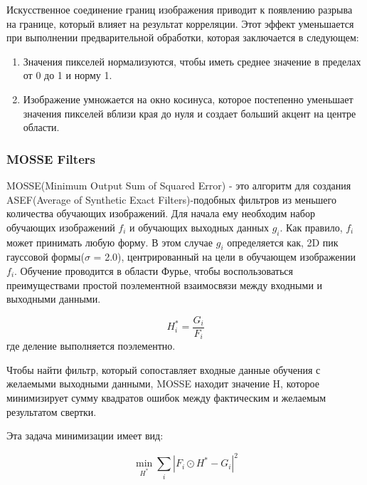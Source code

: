 \documentclass[a4paper,14pt]{extarticle}
\begin{document}
Искусственное соединение границ изображения приводит к появлению разрыва на границе, который влияет на результат корреляции. Этот эффект уменьшается при выполнении предварительной обработки, которая заключается в следующем: 

\begin{enumerate}
    \item Значения пикселей нормализуются, чтобы иметь среднее значение в пределах от 0 до 1 и норму 1.
    \item Изображение умножается на окно косинуса, которое постепенно уменьшает значения пикселей вблизи края до нуля и создает больший акцент на центре области.
\end{enumerate}



\subsubsection{MOSSE Filters}

MOSSE(Minimum Output Sum of Squared Error) - это алгоритм для создания ASEF(Average of Synthetic Exact Filters)-подобных фильтров из меньшего количества обучающих изображений. Для начала ему необходим набор обучающих изображений $f_i$ и обучающих выходных данных $g_i$. Как правило, $f_i$ может принимать любую форму. В этом случае $g_i$ определяется как, 2D пик гауссовой формы($\sigma$ = 2.0), центрированный на цели в обучающем изображении $f_i$. Обучение проводится в области Фурье, чтобы воспользоваться преимуществами простой поэлементной взаимосвязи между входными и выходными данными. 

\begin{equation}
    H_i^* = \frac{G_i}{F_i}
\end{equation}
где деление выполняется поэлементно.


Чтобы найти фильтр, который сопоставляет входные данные обучения с желаемыми выходными данными, MOSSE находит значение H, которое минимизирует сумму квадратов ошибок между фактическим и желаемым результатом свертки.

Эта задача минимизации имеет вид:

\begin{equation}
    \min_{H^*}\sum_i |F_i \odot H^* - G_i|^2
\end{equation}

\end{document}
